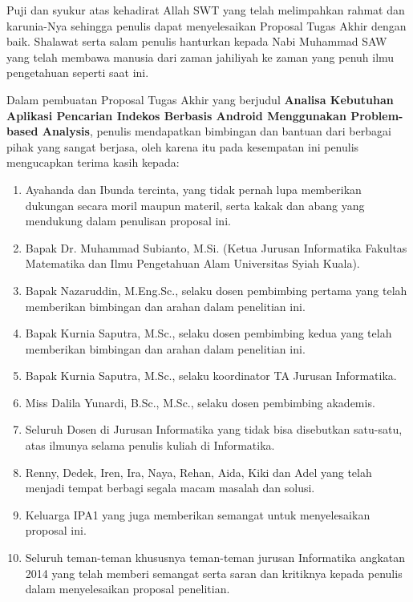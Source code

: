 \preface %

\vspace{0.5cm}
\begin{onehalfspace}
	
Puji dan syukur atas kehadirat Allah SWT yang telah melimpahkan rahmat dan karunia-Nya sehingga penulis dapat menyelesaikan Proposal Tugas Akhir dengan baik. Shalawat serta salam penulis hanturkan kepada Nabi Muhammad SAW yang telah membawa manusia dari zaman jahiliyah ke zaman yang penuh ilmu pengetahuan seperti saat ini.

Dalam pembuatan Proposal Tugas Akhir yang berjudul \textbf{Analisa Kebutuhan Aplikasi Pencarian Indekos Berbasis Android Menggunakan Problem-based Analysis}, penulis mendapatkan bimbingan dan bantuan dari berbagai pihak yang sangat berjasa, oleh karena itu pada kesempatan ini penulis mengucapkan terima kasih kepada:

\begin{enumerate}
\item Ayahanda dan Ibunda tercinta, yang tidak pernah lupa memberikan dukungan secara moril maupun materil, serta kakak dan abang yang mendukung dalam penulisan proposal ini.
\item Bapak Dr. Muhammad Subianto, M.Si. (Ketua Jurusan Informatika Fakultas Matematika dan Ilmu Pengetahuan Alam Universitas Syiah Kuala).
\item Bapak Nazaruddin, M.Eng.Sc., selaku dosen pembimbing pertama yang telah memberikan bimbingan dan arahan dalam penelitian ini.
\item Bapak Kurnia Saputra, M.Sc., selaku dosen pembimbing kedua yang telah memberikan bimbingan dan arahan dalam penelitian ini.
\item Bapak Kurnia Saputra, M.Sc., selaku koordinator TA Jurusan Informatika.
\item Miss Dalila Yunardi, B.Sc., M.Sc.,  selaku dosen pembimbing akademis.
\item Seluruh Dosen di Jurusan Informatika yang tidak bisa disebutkan satu-satu, atas ilmunya selama penulis kuliah di Informatika.
\item Renny, Dedek, Iren, Ira, Naya, Rehan, Aida, Kiki dan Adel yang telah menjadi tempat berbagi segala macam masalah dan solusi.
\item Keluarga IPA1 yang juga memberikan semangat untuk menyelesaikan proposal ini.
\item Seluruh teman-teman khususnya teman-teman jurusan Informatika angkatan 2014 yang telah memberi semangat serta saran dan kritiknya kepada penulis dalam menyelesaikan proposal penelitian.
\end{enumerate}


\end{onehalfspace}
